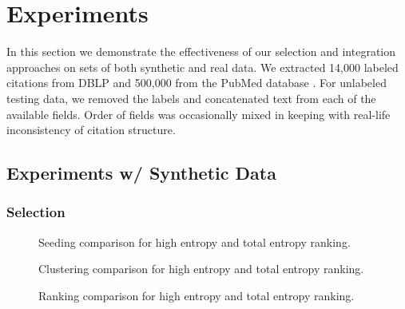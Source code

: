 \section{Experiments}
In this section we demonstrate the effectiveness of our selection and integration approaches on sets of both synthetic and real data.  We extracted 14,000 labeled citations from DBLP  and 500,000 from the PubMed database .  For unlabeled testing data, we removed the labels and concatenated text from each of the available fields.  Order of fields was occasionally mixed in keeping with real-life inconsistency of citation structure.

\subsection{Experiments w/ Synthetic Data}
\subsubsection{Selection}

\begin{figure*}[t]
	\centering
	\caption{Seeding comparison for high entropy and total entropy ranking.}
	\label{fig:select1}
\end{figure*}

\begin{figure*}[t]
	\centering
	\caption{Clustering comparison for high entropy and total entropy ranking.}
	\label{fig:select2}
\end{figure*}

\begin{figure*}[t]
	\centering
	\caption{Ranking comparison for high entropy and total entropy ranking.}
	\label{fig:select3}
\end{figure*}

